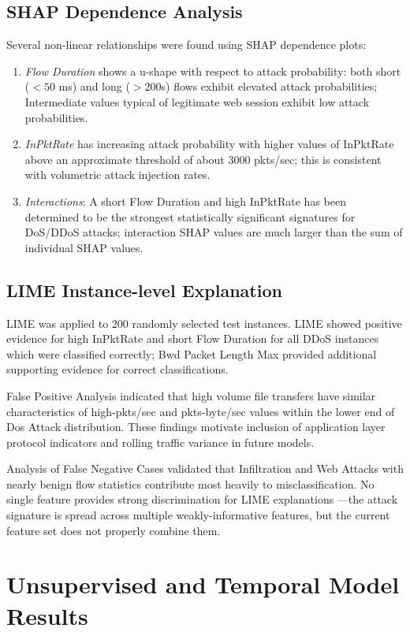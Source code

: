 \subsection{SHAP Dependence Analysis}
Several non-linear relationships were found using SHAP dependence plots:
\begin{enumerate}
\item \textit{Flow Duration} shows a u-shape with respect to attack probability: both short ($ < 50$ ms) and long ($ > 200$s) flows exhibit elevated attack probabilities; Intermediate values typical of legitimate web session exhibit low attack probabilities.
\item \textit{InPktRate} has increasing attack probability with higher values of InPktRate above an approximate threshold of about 3000 pkts/sec; this is consistent with volumetric attack injection rates.
\item \textit{Interactions}: A short Flow Duration and high InPktRate has been determined to be the strongest statistically significant signatures for DoS/DDoS attacks; interaction SHAP values are much larger than the sum of individual SHAP values.
\end{enumerate}
\subsection{LIME Instance-level Explanation}
LIME was applied to 200 randomly selected test instances. LIME showed positive evidence for high InPktRate and short Flow Duration for all DDoS instances which were classified correctly; Bwd Packet Length Max provided additional supporting evidence for correct classifications.

False Positive Analysis indicated that high volume file transfers have similar characteristics of high-pkts/sec and pkts-byte/sec values within the lower end of Dos Attack distribution. These findings motivate inclusion of application layer protocol indicators and rolling traffic variance in future models.

Analysis of False Negative Cases validated that Infiltration and Web Attacks with nearly benign flow statistics contribute most heavily to misclassification. No single feature provides strong discrimination for LIME explanations ---the attack signature is spread across multiple weakly-informative features, but the current feature set does not properly combine them.

\section{Unsupervised and Temporal Model Results}

